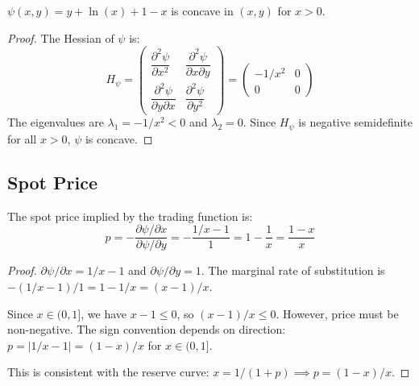 \begin{proposition}\label{prop:psi-concave}
$\psi(x,y) = y + \ln(x) + 1 - x$ is concave in $(x,y)$ for $x > 0$.
\end{proposition}

\begin{proof}
The Hessian of $\psi$ is:
\begin{equation}\label{eq:hessian}
  H_\psi = \begin{pmatrix}
    \dfrac{\partial^2 \psi}{\partial x^2} & \dfrac{\partial^2 \psi}{\partial x \partial y} \\[8pt]
    \dfrac{\partial^2 \psi}{\partial y \partial x} & \dfrac{\partial^2 \psi}{\partial y^2}
  \end{pmatrix}
  = \begin{pmatrix}
    -1/x^2 & 0 \\
    0 & 0
  \end{pmatrix}
\end{equation}
The eigenvalues are $\lambda_1 = -1/x^2 < 0$ and $\lambda_2 = 0$.
Since $H_\psi$ is negative semidefinite for all $x > 0$, $\psi$ is concave. \qedhere
\end{proof}

\subsection{Spot Price}

\begin{proposition}\label{prop:spot-price}
The spot price implied by the trading function is:
\begin{equation}\label{eq:spot-price}
  p = -\frac{\partial \psi / \partial x}{\partial \psi / \partial y}
    = -\frac{1/x - 1}{1}
    = 1 - \frac{1}{x}
    = \frac{1-x}{x}
\end{equation}
\end{proposition}

\begin{proof}
$\partial \psi / \partial x = 1/x - 1$ and $\partial \psi / \partial y = 1$.
The marginal rate of substitution is $-(1/x - 1)/1 = 1 - 1/x = (x-1)/x$.

Since $x \in (0,1]$, we have $x - 1 \leq 0$, so $(x-1)/x \leq 0$.
However, price must be non-negative. The sign convention depends on direction:
$p = |1/x - 1| = (1-x)/x$ for $x \in (0,1]$.

This is consistent with the reserve curve: $x = 1/(1+p) \implies p = (1-x)/x$. \qedhere
\end{proof}

